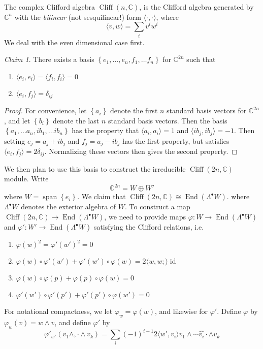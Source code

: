 \documentclass[psamsfonts]{amsart}
\theoremstyle{definition}
\theoremstyle{remark}
\newtheorem*{claim}{Claim}
\newcommand{\C}{\mathbb{C}}
\newcommand{\set}[1]{\left\lbrace #1 \right\rbrace}
\DeclareMathOperator{\id}{id}
\DeclareMathOperator{\End}{End}
\DeclareMathOperator{\Cliff}{Cliff}
\DeclareMathOperator{\spn}{span}
\begin{document}
The complex Clifford algebra $\Cliff(n,\C)$, is the Clifford algebra generated by $\C^n$ with the \emph{bilinear} (not sesquilinear!) form $\langle \cdot, \cdot \rangle$, where
\[
\langle v,w \rangle = \sum_i v^iw^i
\]
We deal with the even dimensional case first.
%
\begin{claim}
There exists a basis $\set{e_1, \ldots, e_n, f_1, \ldots f_n}$ for $\C^{2n}$ such that 
\begin{enumerate}
\item $\langle e_i, e_i \rangle = \langle f_i, f_i \rangle = 0$ 
\item $\langle e_i, f_j \rangle = \delta_{ij}$
\end{enumerate}
\end{claim}
%
\begin{proof}
For convenience, let $\set{a_i}$ denote the first $n$ standard basis vectors for $\C^{2n}$, and let $\set{b_i}$ denote the last $n$ standard basis vectors. Then the basis $\set{a_1, \ldots a_n, ib_1, \ldots ib_n}$ has the property that $\langle a_i, a_i \rangle = 1$ and $\langle ib_j, ib_j \rangle = -1$. Then setting $e_j = a_j + ib_j$ and $f_j = a_j - ib_j$ has the first property, but satisfies $\langle e_i, f_j \rangle = 2\delta_{ij}$. Normalizing these vectors then gives the second property.
\end{proof}
%
We then plan to use this basis to construct the irreducible $\Cliff(2n, \C)$ module. Write 
\[
\C^{2n} = W \oplus W'
\]
where $W = \spn\set{e_i}$. We claim that $\Cliff(2n, \C) \cong \End(\Lambda^\bullet W)$. where $\Lambda^\bullet W$ denotes the exterior algebra of $W$. To construct a map $\Cliff(2n, \C) \to \End(\Lambda^\bullet W)$, we need to provide maps $\varphi : W \to \End(\Lambda^\bullet W)$ and $\varphi' : W' \to \End(\Lambda^\bullet W)$ satisfying the Clifford relations, i.e.
%
\begin{enumerate}
\item $\varphi(w)^2 = \varphi'(w')^2 = 0$
\item $\varphi(w) \circ \varphi'(w') + \varphi'(w') \circ \varphi(w) = 2\langle w,w; \rangle\id $
\item $\varphi(w) \circ \varphi(p) + \varphi(p) \circ \varphi(w) = 0 $
\item $\varphi'(w') \circ \varphi'(p') + \varphi'(p') \circ \varphi(w') = 0$
\end{enumerate}
%
For notational compactness, we let $\varphi_w = \varphi(w)$, and likewise for $\varphi'$. Define $\varphi$ by $\varphi_w(v) = w \wedge v$, and define $\varphi'$ by 
\[
\varphi'_{w'}(v_1 \wedge, \cdot \wedge v_k) = \sum_i (-1)^{i-1} 2\langle w', v_i \rangle v_1 \wedge \cdots \hat{v_i} \cdot \wedge v_k
\]
\end{document}
